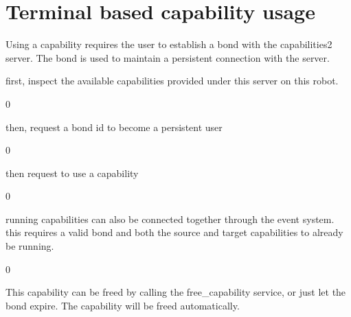 \chapter{Terminal based capability usage}
\hypertarget{md_capabilities2__server_2docs_2terminal__usage}{}\label{md_capabilities2__server_2docs_2terminal__usage}
\label{md_capabilities2__server_2docs_2terminal__usage_autotoc_md40}%
%
 Using a capability requires the user to establish a bond with the capabilities2 server. The bond is used to maintain a persistent connection with the server.

first, inspect the available capabilities provided under this server on this robot.


\begin{DoxyCode}{0}

\end{DoxyCode}


then, request a bond id to become a persistent user


\begin{DoxyCode}{0}
\DoxyCodeLine{}

\end{DoxyCode}


then request to use a capability


\begin{DoxyCode}{0}

\end{DoxyCode}


running capabilities can also be connected together through the event system. this requires a valid bond and both the source and target capabilities to already be running.


\begin{DoxyCode}{0}

\end{DoxyCode}


This capability can be freed by calling the {\ttfamily free\+\_\+capability} service, or just let the bond expire. The capability will be freed automatically. 